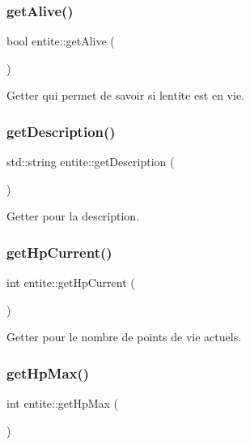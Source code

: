 \subsubsection{\texorpdfstring{get\+Alive()}{getAlive()}}
{\footnotesize\ttfamily bool entite\+::get\+Alive (\begin{DoxyParamCaption}{ }\end{DoxyParamCaption})}



Getter qui permet de savoir si l\textquotesingle{}entite est en vie. 

\mbox{\label{classentite_ab19b8d18b4d947c85063b2225bbb9144}} 
\subsubsection{\texorpdfstring{get\+Description()}{getDescription()}}
{\footnotesize\ttfamily std\+::string entite\+::get\+Description (\begin{DoxyParamCaption}{ }\end{DoxyParamCaption})}



Getter pour la description. 

\mbox{\label{classentite_ae41fa12581d2f94d5f6ae67fec4e56e9}} 
\subsubsection{\texorpdfstring{get\+Hp\+Current()}{getHpCurrent()}}
{\footnotesize\ttfamily int entite\+::get\+Hp\+Current (\begin{DoxyParamCaption}{ }\end{DoxyParamCaption})}



Getter pour le nombre de points de vie actuels. 

\mbox{\label{classentite_ab8e6c4dd900884cba5bec025f1e55999}} 
\subsubsection{\texorpdfstring{get\+Hp\+Max()}{getHpMax()}}
{\footnotesize\ttfamily int entite\+::get\+Hp\+Max (\begin{DoxyParamCaption}{ }\end{DoxyParamCaption})}




